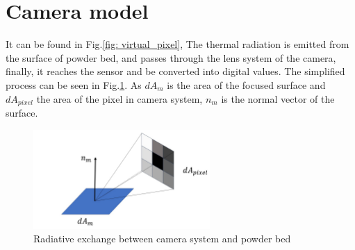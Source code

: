 \section{Camera model}
It can be found in Fig.\ref{fig: virtual_pixel}, The thermal radiation is emitted from the surface of powder bed, and passes through 
the lens system of the camera, finally, it reaches the sensor and be converted into 
digital values. The simplified process can be seen in Fig.\ref{fig: view_factor}. As $dA_m$ is the 
area of the focused surface and $dA_{pixel}$ the area of the pixel in camera system, $n_m$ is the 
normal vector of the surface.

\begin{figure}[htbp]
    \centering
    \includegraphics[width=0.6\textwidth]{figures/view_factor.jpg}
    \caption{Radiative exchange between camera system and powder bed}
    \label{fig: view_factor}
\end{figure}

